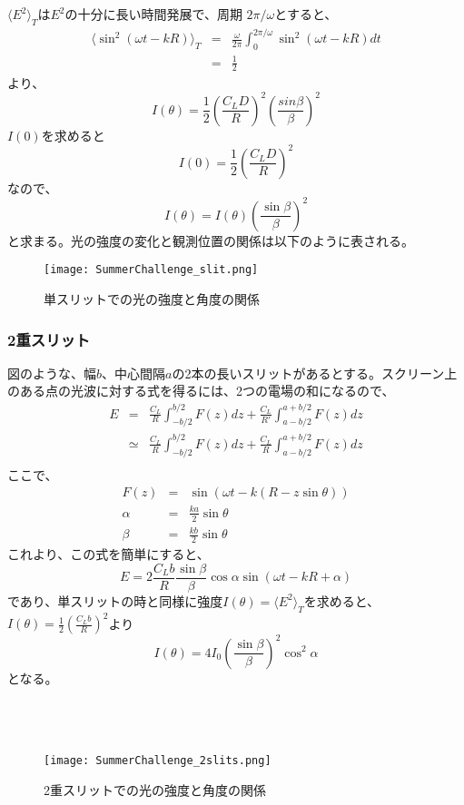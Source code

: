 \documentclass[10pt,a4j]{jarticle}
\begin{document}
$\langle E^2\rangle_T$は$E^2$の十分に長い時間発展で、周期 $2\pi / \omega$とすると、
\begin{eqnarray*}
 \langle \sin^2(\omega t - kR)\rangle_T  &=& \frac{\omega}{2\pi} \int_{0}^{2\pi / \omega} \sin^2(\omega t - kR) dt \\
 &=& \frac{1}{2} 
 \end{eqnarray*}
 より、
\[
I(\theta) = \frac{1}{2} \left(\frac{C_L D}{R}\right)^2 \left(\frac{sin \beta}{\beta}\right)^2
\]
$I(0)$を求めると
\[
I(0) = \frac{1}{2} \left(\frac{C_L D}{R}\right)^2
\]
なので、
\[
I(\theta) = I(\theta) \left(\frac{\sin \beta}{\beta}\right)^2
\]
と求まる。光の強度の変化と観測位置の関係は以下のように表される。\\

\begin{figure}[h]
\begin{center}
\texttt{[image: SummerChallenge\_slit.png]}
\caption{単スリットでの光の強度と角度の関係}
\end{center}
\end{figure}

\clearpage

\subsubsection{2重スリット}
図のような、幅$b$、中心間隔$a$の2本の長いスリットがあるとする。スクリーン上のある点の光波に対する式を得るには、2つの電場の和になるので、
\begin{eqnarray*}
E &=& \frac{C_L}{R} \int_{-b/2}^{b/2} F(z) dz + \frac{C_L}{R'} \int_{a-b/2}^{a+b/2} F(z) dz \\
&\simeq& \frac{C_L}{R} \int_{-b/2}^{b/2} F(z) dz + \frac{C_L}{R} \int_{a-b/2}^{a+b/2} F(z) dz \\ 
\end{eqnarray*}
ここで、
\begin{eqnarray*}
F(z) &=& \sin(\omega t - k(R-z\sin\theta)) \\
\alpha &=& \frac{ka}{2} \sin\theta \\
\beta &=& \frac{kb}{2} \sin\theta
\end{eqnarray*}
これより、この式を簡単にすると、
\[
E = 2 \frac{C_L b}{R} \frac{\sin\beta}{\beta} \cos\alpha \sin(\omega t -kR + \alpha)
\]
であり、単スリットの時と同様に強度$I(\theta) = \langle E^2\rangle_T$を求めると、$I(\theta) = \frac{1}{2} (\frac{C_L b}{R})^2$より
\[
I(\theta) = 4I_0 \left(\frac{\sin \beta}{\beta}\right)^2 \cos^2 \alpha
\]
となる。\\
\\
\\
\\
\begin{figure}[h]
\begin{center}
\texttt{[image: SummerChallenge\_2slits.png]}
\caption{2重スリットでの光の強度と角度の関係}
\end{center}
\end{figure}
\end{document}
